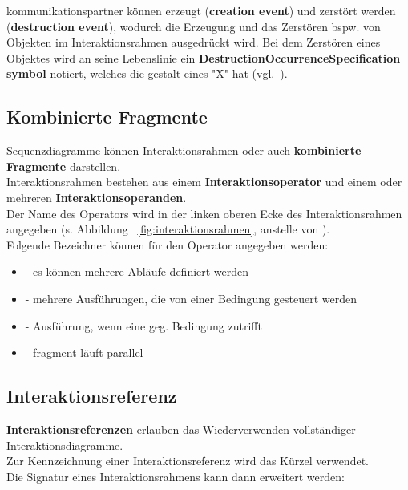 \noindent
kommunikationspartner können erzeugt (\textbf{creation event}) und zerstört werden (\textbf{destruction event}), wodurch die Erzeugung und das Zerstören bspw. von Objekten im Interaktionsrahmen ausgedrückt wird.
Bei dem Zerstören eines Objektes wird an seine Lebenslinie ein \textbf{DestructionOccurrenceSpecification symbol} notiert, welches die gestalt eines "X" hat (vgl.~\cite[578]{OMG17}).

\subsection{Kombinierte Fragmente}
Sequenzdiagramme können Interaktionsrahmen oder auch \textbf{kombinierte Fragmente} darstellen.\\
Interaktionsrahmen bestehen aus einem \textbf{Interaktionsoperator} und einem oder mehreren \textbf{Interaktionsoperanden}.\\
Der Name des Operators wird in der linken oberen Ecke des Interaktionsrahmen angegeben (s. Abbildung ~\ref{fig:interaktionsrahmen}, anstelle von ).\\
Folgende Bezeichner können für den Operator angegeben werden:

\begin{itemize}
    \item {} - es können mehrere Abläufe definiert werden
    \item {} - mehrere Ausführungen, die von einer Bedingung gesteuert werden
    \item {} - Ausführung, wenn eine geg. Bedingung zutrifft
    \item {} - fragment läuft parallel
\end{itemize}

\subsection{Interaktionsreferenz}

\textbf{Interaktionsreferenzen} erlauben das Wiederverwenden vollständiger Interaktionsdiagramme.\\
Zur Kennzeichnung einer Interaktionsreferenz wird das Kürzel  verwendet.\\
Die Signatur eines Interaktionsrahmens kann dann erweitert werden:\\

\noindent
{}\\

